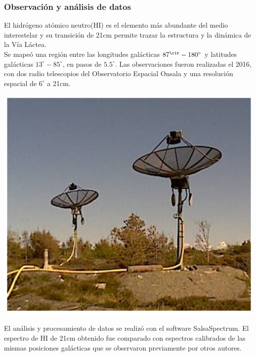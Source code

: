 \documentclass[8pt]{beamer}
\begin{document}
\begin{frame}
\frametitle{Observación y análisis de datos}
El hidrógeno atómico neutro(HI) es el elemento más abundante del medio interestelar y su transición de 21cm permite trazar la estructura y la dinámica de la Vía Láctea.\\

Se mapeó una región entre las longitudes galácticas $87^\cir-180^\circ$ y latitudes galácticas $13^\circ-85^\circ$, en pasos de $5.5^\circ$. Las observaciones fueron realizadas el 2016, con dos radio telescopios del Observatorio Espacial Onsala y una resolución espacial de $6^{\circ}$ a 21cm.
\begin{center}
\includegraphics[width=0.3\linewidth]{figures/onsala.png}
\end{center}
El análisis y procesamiento de datos se realizó con el software SalsaSpectrum. El espectro de HI de 21cm obtenido fue comparado con espectros calibrados de las mismas posiciones galácticas que se observaron previamente por otros autores.

\end{frame}
\end{document}
